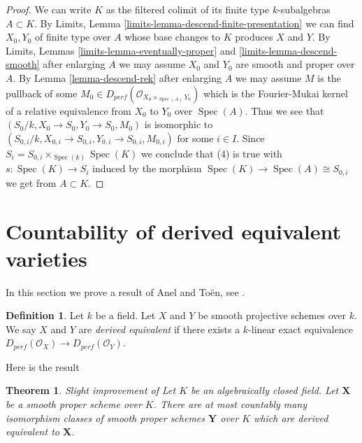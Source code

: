 \documentclass{stacks-project}
\newenvironment{reference}{\comment}{\endcomment}
\theoremstyle{plain}
\newtheorem{theorem}[subsection]{Theorem}
\theoremstyle{definition}
\newtheorem{definition}[subsection]{Definition}
\theoremstyle{remark}
\numberwithin{equation}{subsection}
\def\Spec{\mathop{\mathrm{Spec}}}
\begin{document}
\begin{proof}
\medskip\noindent
We can write $K$ as the filtered colimit of its finite type
$k$-subalgebras $A \subset K$. By
Limits, Lemma \ref{limits-lemma-descend-finite-presentation}
we can find $X_0, Y_0$ of finite type over $A$ whose
base changes to $K$ produces $X$ and $Y$.
By Limits, Lemmas
\ref{limits-lemma-eventually-proper} and \ref{limits-lemma-descend-smooth}
after enlarging $A$ we may assume $X_0$ and $Y_0$
are smooth and proper over $A$.
By Lemma \ref{lemma-descend-rek}
after enlarging $A$ we may assume $M$ is the pullback of
some $M_0  \in D_{perf}(\mathcal{O}_{X_0 \times_{\Spec(A)} Y_0})$
which is the Fourier-Mukai kernel of a relative equivalence
from $X_0$ to $Y_0$ over $\Spec(A)$.
Thus we see that $(S_0/k, X_0 \to S_0, Y_0 \to S_0, M_0)$
is isomorphic to
$(S_{0, i}/k, X_{0, i} \to S_{0, i}, Y_{0, i} \to S_{0, i}, M_{0, i})$
for some $i \in I$.
Since $S_i = S_{0, i} \times_{\Spec(k)} \Spec(K)$
we conclude that (4) is true with $s : \Spec(K) \to S_i$
induced by the morphism $\Spec(K) \to \Spec(A) \cong S_{0, i}$
we get from $A \subset K$.
\end{proof}








\section{Countability of derived equivalent varieties}
\label{section-countable-derived-equivalent}

\noindent
In this section we prove a result of Anel and To\"en, see \cite{AT}.

\begin{definition}
\label{definition-derived-equivalent}
Let $k$ be a field. Let $X$ and $Y$ be smooth projective schemes over $k$.
We say $X$ and $Y$ are {\it derived equivalent} if there exists a $k$-linear
exact equivalence
$D_{perf}(\mathcal{O}_X) \to D_{perf}(\mathcal{O}_Y)$.
\end{definition}

\noindent
Here is the result

\begin{theorem}
\label{theorem-countable}
\begin{reference}
Slight improvement of \cite{AT}
\end{reference}
Let $K$ be an algebraically closed field. Let $\mathbf{X}$ be a smooth proper
scheme over $K$. There are at most countably many isomorphism classes
of smooth proper schemes $\mathbf{Y}$ over $K$ which are derived
equivalent to $\mathbf{X}$.
\end{theorem}
\end{document}

